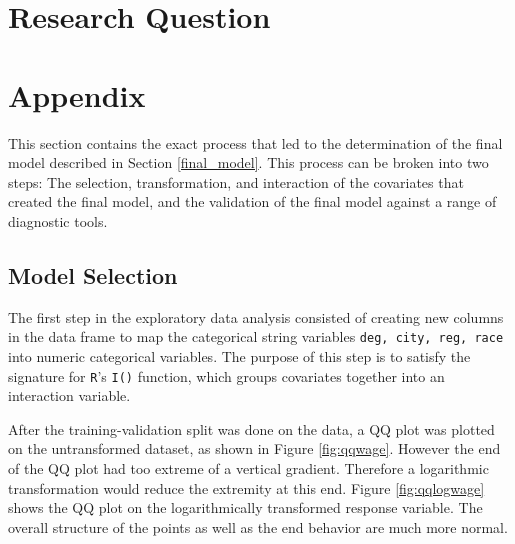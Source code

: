 \documentclass{article}
\begin{document}
  \section{Research Question}

  \section{Appendix}
    This section contains the exact process that led to the determination of the final
    model described in Section \ref{final_model}. This process can be broken into two steps:
    The selection, transformation, and interaction of the covariates that created the
    final model, and the validation of the final model against a range of diagnostic tools.

    \subsection{Model Selection}
      The first step in the exploratory data analysis consisted of creating new columns in the
      data frame to map the categorical string variables \texttt{deg, city, reg, race} into
      numeric categorical variables. The purpose of this step is to satisfy the signature for \texttt{R}'s \texttt{I()}
      function, which groups covariates together into an interaction variable.

      After the training-validation split was done on the data, a QQ plot was plotted on
      the untransformed dataset, as shown in Figure \ref{fig:qqwage}. However the end
      of the QQ plot had too extreme of a vertical gradient. Therefore a logarithmic
      transformation would reduce the extremity at this end. Figure \ref{fig:qqlogwage}
      shows the QQ plot on the logarithmically transformed response variable. The
      overall structure of the points as well as the end behavior are much more
      normal.
\end{document}
